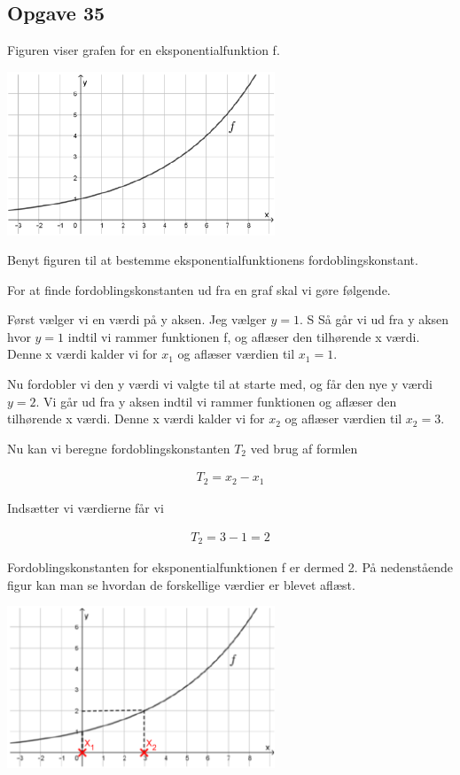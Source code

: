 \subsection{Opgave 35}

Figuren viser grafen for en eksponentialfunktion f.

\includegraphics[width=8cm]{Opgave_31-40/Opgave_35/35.png}

Benyt figuren til at bestemme eksponentialfunktionens fordoblingskonstant.

\ans 

For at finde fordoblingskonstanten ud fra en graf skal vi gøre følgende.

Først vælger vi en værdi på y aksen. Jeg vælger $y  = 1$. S
Så går vi ud fra y aksen hvor $y = 1$ indtil vi rammer funktionen f, og aflæser den tilhørende x værdi.
Denne x værdi kalder vi for $x_1$ og aflæser værdien til $x_1 = 1$.

Nu fordobler vi den y værdi vi valgte til at starte med, og får den nye y værdi $y = 2$.
Vi går ud fra y aksen indtil vi rammer funktionen og aflæser den tilhørende x værdi.
Denne x værdi kalder vi for $x_2$ og aflæser værdien til $x_2 = 3$.

Nu kan vi beregne fordoblingskonstanten $T_2$ ved brug af formlen

\begin{align*}
    T_2 = x_2 - x_1
\end{align*}

Indsætter vi værdierne får vi

\begin{align*}
    T_2 = 3 - 1 = 2
\end{align*}

Fordoblingskonstanten for eksponentialfunktionen f er dermed 2.
På nedenstående figur kan man se hvordan de forskellige værdier er blevet aflæst.

\includegraphics[width=8cm]{Opgave_31-40/Opgave_35/35.1.png}